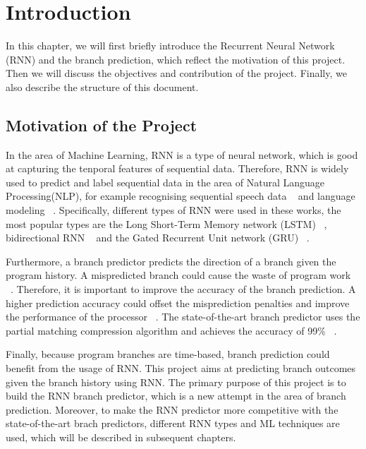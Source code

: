 \chapter{Introduction}
\label{chap:introduction}

In this chapter, we will first briefly introduce the Recurrent Neural Network (RNN) and the branch prediction, which reflect the motivation of this project. Then we will discuss the objectives and contribution of the project. Finally, we also describe the structure of this document.

\section{Motivation of the Project}
\label{sec:motivation}

In the area of Machine Learning, RNN is a type of neural network, which is good at capturing the tenporal features of sequential data. Therefore, RNN is widely used to predict and label sequential data in the area of Natural Language Processing(NLP), for example recognising sequential speech data ~\citep{graves2013speech} and language modeling ~\citep{mikolov2010recurrent}. Specifically, different types of RNN were used in these works, the most popular types are the Long Short-Term Memory network (LSTM) ~\citep{gers1999learning}, bidirectional RNN ~\citep{graves2013speech} and the Gated Recurrent Unit network (GRU) ~\citep{cho2014learning}. 

Furthermore, a branch predictor predicts the direction of a branch given the program history. A mispredicted branch could cause the waste of program work ~\citep{michaud1996skewed}. Therefore, it is important to improve the accuracy of the branch prediction. A higher prediction accuracy could offset the misprediction penalties and improve the performance of the processor ~\citep{leedynamic}. The state-of-the-art branch predictor uses the partial matching compression algorithm and achieves the accuracy of 99\% ~\citep{seznec2006case}.

Finally, because program branches are time-based, branch prediction could benefit from the usage of RNN. This project aims at predicting branch outcomes given the branch history using RNN. The primary purpose of this project is to build the RNN branch predictor, which is a new attempt in the area of branch prediction. Moreover, to make the RNN predictor more competitive with the state-of-the-art brach predictors, different RNN types and ML techniques are used, which will be described in subsequent chapters. 

